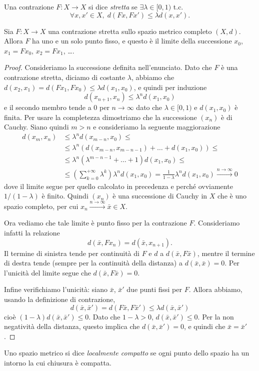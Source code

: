 \begin{definizione}
	Una contrazione $F:X\to X$ si dice \emph{stretta} se $\exists\lambda\in [0,1)$ t.c. 
	$$\forall x, x'\in X,\; d(Fx, Fx')\leq \lambda d(x,x').$$
\end{definizione}

\begin{teorema}
	Sia $F:X\to X$ una contrazione stretta sullo spazio metrico completo $(X,d)$. Allora $F$ ha uno e un solo punto fisso, e questo è il limite della successione $x_{0}$, $x_{1} = Fx_{0}$, $x_{2} = Fx_{1}$, \dots.
\end{teorema}
\begin{proof}
	Consideriamo la successione definita nell'enunciato. Dato che $F$ è una contrazione stretta, diciamo di costante $\lambda$, abbiamo che $d(x_{2},x_{1}) = d(Fx_{1}, Fx_{0}) \leq \lambda d(x_{1},x_{0})$, e quindi per induzione
	$$d(x_{n+1}, x_{n})\leq \lambda^{n}d(x_{1},x_{0})$$
	e il secondo membro tende a 0 per $n\to\infty$ dato che $\lambda \in [0,1)$ e $d(x_{1},x_{0})$ è finita. 
	Per usare la completezza dimostriamo che la successione $(x_{n})$ è di Cauchy. Siano quindi $m>n$ e consideriamo la seguente maggiorazione 
	\begin{align*}
		d(x_{m},x_{n}) &\leq 
		\lambda^{n}d(x_{m-n}, x_{0})\leq \\&\leq
		\lambda^{n}(d(x_{m-n}, x_{m-n-1}) + \dots + d(x_{1},x_{0}))\leq \\ &\leq
		\lambda^{n}(\lambda^{m-n-1} + \dots + 1)d(x_{1},x_{0}) \leq\\&\leq
		\left(\sum_{k = 0}^{+\infty}\lambda^{k}\right)\lambda^{n}d(x_{1},x_{0}) = \frac{1}{1-\lambda}\lambda^{n}d(x_{1},x_{0})\xrightarrow{n\to\infty}0
	\end{align*}
	dove il limite segue per quello calcolato in precedenza e perché ovviamente $1/(1-\lambda)$ è finito. 
	Quindi $(x_{n})$ è una successione di Cauchy in $X$ che è uno spazio completo, per cui $x_{n}\xrightarrow{n\to\infty}\bar x\in X$.
	
	Ora vediamo che tale limite è punto fisso per la contrazione $F$. Consideriamo infatti la relazione
	$$d(\bar x, Fx_{n}) = d(\bar x, x_{n+1}).$$
	Il termine di sinistra tende per continuità di $F$ e $d$ a $d(\bar x, F\bar x)$, mentre il termine di destra tende (sempre per la continuità della distanza) a $d(\bar x, \bar x) = 0$. Per l'unicità del limite segue che $d(\bar x, F\bar x) = 0$.
	
	Infine verifichiamo l'unicità: siano $\bar x$, $\bar x'$ due punti fissi per $F$. Allora abbiamo, usando la definizione di contrazione, 
	$$d(\bar x, \bar x') = d(F\bar x, F\bar x')\leq \lambda d(\bar x, \bar x')$$
	cioè $(1-\lambda)d(\bar x, \bar x') \leq 0$. Dato che $1-\lambda > 0$, $d(\bar x, \bar x') \leq 0$. Per la non negatività della distanza, questo implica che $d(\bar x, \bar x') = 0$, e quindi che $\bar x = \bar x'$.
\end{proof}
\begin{definizione}
	Uno spazio metrico si dice \emph{localmente compatto} se ogni punto dello spazio ha un intorno la cui chiusura è compatta. 
\end{definizione}

